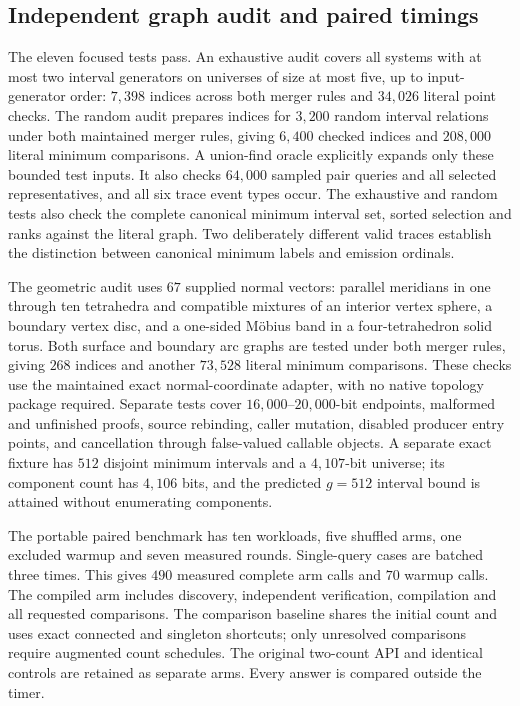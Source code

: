 \subsection{Independent graph audit and paired timings}

The eleven focused tests pass.  An exhaustive audit covers all systems with at most two interval generators
on universes of size at most five, up to input-generator order: $7{,}398$
indices across both merger rules and $34{,}026$ literal point checks.
The random audit prepares indices for $3{,}200$ random
interval relations under both maintained merger rules, giving $6{,}400$
checked indices and $208{,}000$ literal minimum comparisons.  A union-find
oracle explicitly expands only these bounded test inputs.  It also checks
$64{,}000$ sampled pair queries and all selected representatives, and all six
trace event types occur. The exhaustive and random tests also check the
complete canonical minimum interval set, sorted selection and ranks against
the literal graph. Two deliberately different valid traces establish
the distinction between canonical minimum labels and emission ordinals.

The geometric audit uses $67$ supplied normal vectors: parallel meridians
in one through ten tetrahedra and compatible mixtures of an interior
vertex sphere, a boundary vertex disc, and a one-sided M\"obius band in a
four-tetrahedron solid torus.  Both surface and boundary arc graphs are
tested under both merger rules, giving $268$ indices and another $73{,}528$
literal minimum comparisons.  These checks use the maintained exact
normal-coordinate adapter, with no native topology package required.
Separate tests cover $16{,}000$--$20{,}000$-bit endpoints, malformed and
unfinished proofs, source rebinding, caller mutation, disabled producer
entry points, and cancellation through false-valued callable objects.  A
separate exact fixture has $512$ disjoint minimum intervals and a $4{,}107$-bit
universe; its component count has $4{,}106$ bits, and the predicted $g=512$
interval bound is attained without enumerating components.

The portable paired benchmark has ten workloads, five shuffled arms,
one excluded warmup and seven measured rounds.  Single-query cases are
batched three times.  This gives $490$ measured complete arm calls and
$70$ warmup calls.  The compiled arm includes discovery, independent
verification, compilation and all requested comparisons.  The comparison
baseline shares the initial count and uses exact connected and singleton
shortcuts; only unresolved comparisons require augmented count schedules.
The original two-count API and identical controls are retained as separate
arms.  Every answer is compared outside the timer.


